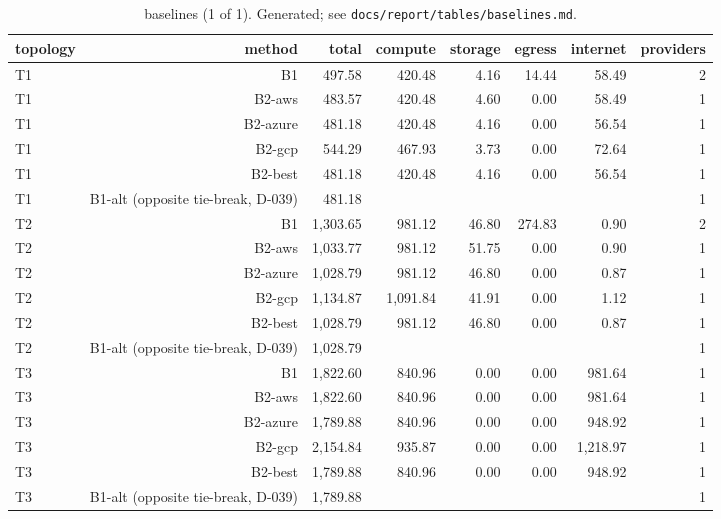 \begin{table}[t]
\centering
\small
\begin{tabular}{lrrrrrrr}
\toprule
topology & method & total & compute & storage & egress & internet & providers \\
\midrule
T1 & B1 & 497.58 & 420.48 & 4.16 & 14.44 & 58.49 & 2 \\
T1 & B2-aws & 483.57 & 420.48 & 4.60 & 0.00 & 58.49 & 1 \\
T1 & B2-azure & 481.18 & 420.48 & 4.16 & 0.00 & 56.54 & 1 \\
T1 & B2-gcp & 544.29 & 467.93 & 3.73 & 0.00 & 72.64 & 1 \\
T1 & B2-best & 481.18 & 420.48 & 4.16 & 0.00 & 56.54 & 1 \\
T1 & B1-alt (opposite tie-break, D-039) & 481.18 &  &  &  &  & 1 \\
T2 & B1 & 1,303.65 & 981.12 & 46.80 & 274.83 & 0.90 & 2 \\
T2 & B2-aws & 1,033.77 & 981.12 & 51.75 & 0.00 & 0.90 & 1 \\
T2 & B2-azure & 1,028.79 & 981.12 & 46.80 & 0.00 & 0.87 & 1 \\
T2 & B2-gcp & 1,134.87 & 1,091.84 & 41.91 & 0.00 & 1.12 & 1 \\
T2 & B2-best & 1,028.79 & 981.12 & 46.80 & 0.00 & 0.87 & 1 \\
T2 & B1-alt (opposite tie-break, D-039) & 1,028.79 &  &  &  &  & 1 \\
T3 & B1 & 1,822.60 & 840.96 & 0.00 & 0.00 & 981.64 & 1 \\
T3 & B2-aws & 1,822.60 & 840.96 & 0.00 & 0.00 & 981.64 & 1 \\
T3 & B2-azure & 1,789.88 & 840.96 & 0.00 & 0.00 & 948.92 & 1 \\
T3 & B2-gcp & 2,154.84 & 935.87 & 0.00 & 0.00 & 1,218.97 & 1 \\
T3 & B2-best & 1,789.88 & 840.96 & 0.00 & 0.00 & 948.92 & 1 \\
T3 & B1-alt (opposite tie-break, D-039) & 1,789.88 &  &  &  &  & 1 \\
\bottomrule
\end{tabular}
\caption{baselines (1 of 1). Generated; see \texttt{docs/report/tables/baselines.md}.}
\label{tab:baselines-1}
\end{table}
